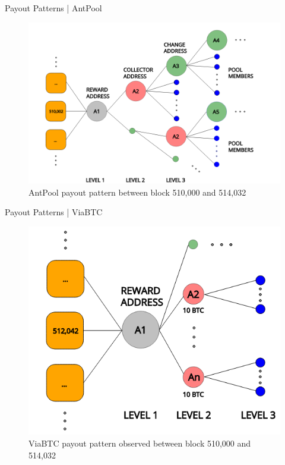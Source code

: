 \documentclass[10pt]{beamer}
\begin{document}
\begin{frame}[fragile]{Payout Patterns | AntPool}
    \begin{figure}
        \includegraphics[width=.8\textwidth]{images/flow_AntPool_example1.png}
        \\AntPool payout pattern between block 510,000 and 514,032
    \end{figure}
\end{frame}

\begin{frame}[fragile]{Payout Patterns | ViaBTC}
    \begin{figure}
        \includegraphics[width=.5\textwidth]{images/flow_ViaBTC_example2.png}
        \\ViaBTC payout pattern observed between block 510,000 and 514,032
    \end{figure}
\end{frame}
\end{document}
